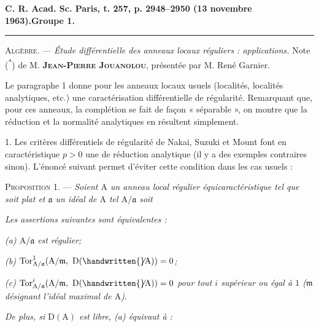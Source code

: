 \textbf{C. R. Acad. Sc. Paris, t. 257, p. 2948--2950 (13 novembre 1963).}\hfill\textbf{Groupe 1.}\par\noindent\rule{\linewidth}{0.4pt}

\textsc{Algèbre.} --- \textit{Étude différentielle des anneaux locaux réguliers : applications.} Note (\textsuperscript{*}) de M. \textbf{\textsc{Jean-Pierre Jouanolou}}, présentée par M. René Garnier.

Le paragraphe 1 donne pour les anneaux locaux usuels (localités, localités analytiques, etc.) une caractérisation différentielle de régularité. Remarquant que, pour ces anneaux, la complétion se fait de façon « séparable », on montre que la réduction et la normalité analytiques en résultent simplement.

1. Les critères différentiels de régularité de Nakai, Suzuki et Mount font  en caractéristique $p>0$  une  de réduction analytique (il y a des exemples contraires sinon). L’énoncé suivant permet d’éviter cette condition dans les cas usuels :

\margin{\handwritten{$\left.\rule{0pt}{7em}\right]$}}\textsc{Proposition 1.} --- \textit{Soient $\mathrm A$ un anneau local régulier équicaractéristique tel que  soit plat et $\mathfrak a$ un idéal de $\mathrm A$ tel $\mathrm A/\mathfrak a$ soit }

\textit{Les assertions suivantes sont équivalentes :}

\textit{(a) $\mathrm A/\mathfrak a$ est régulier;}

\textit{(b) $\operatorname{Tor}^{1}_{\mathrm A/\mathfrak a}(\mathrm A/\mathfrak m,\ \mathrm D(\handwritten{\not}\mathrm A))=0$;}

\textit{(c) $\operatorname{Tor}^{i}_{\mathrm A/\mathfrak a}(\mathrm A/\mathfrak m,\ \mathrm D(\handwritten{\not}\mathrm A))=0$ pour tout $i$ supérieur ou égal à $1$ ($\mathfrak m$ désignant l’idéal maximal de $\mathrm A$).}

\textit{De plus, si $\mathrm D(\mathrm A)$ est libre, (a) équivaut à :}

